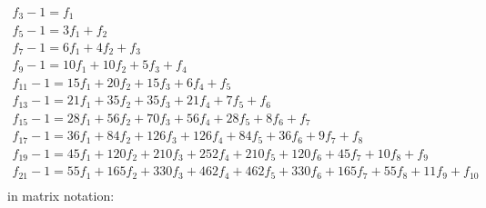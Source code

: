 \documentclass[a4paper,dottedtoc,headinclude,footinclude]{report} %
\theoremstyle{plain}
\begin{document}
    \begin{displaymath}
        \begin{array}{c}f_{3} - 1 = f_{1}\\
        f_{5} - 1 = 3 f_{1} + f_{2}\\
        f_{7} - 1 = 6 f_{1} + 4 f_{2} + f_{3}\\
        f_{9} - 1 = 10 f_{1} + 10 f_{2} + 5 f_{3} + f_{4}\\
        f_{11} - 1 = 15 f_{1} + 20 f_{2} + 15 f_{3} + 6 f_{4} + f_{5}\\
        f_{13} - 1 = 21 f_{1} + 35 f_{2} + 35 f_{3} + 21 f_{4} + 7 f_{5} + f_{6}\\
        f_{15} - 1 = 28 f_{1} + 56 f_{2} + 70 f_{3} + 56 f_{4} + 28 f_{5} + 8 f_{6} + f_{7}\\
        f_{17} - 1 = 36 f_{1} + 84 f_{2} + 126 f_{3} + 126 f_{4} + 84 f_{5} + 36 f_{6} + 9 f_{7} + f_{8}\\
        f_{19} - 1 = 45 f_{1} + 120 f_{2} + 210 f_{3} + 252 f_{4} + 210 f_{5} + 120 f_{6} + 45 f_{7} + 10 f_{8} + f_{9}\\
        f_{21} - 1 = 55 f_{1} + 165 f_{2} + 330 f_{3} + 462 f_{4} + 462 f_{5} + 330 f_{6} + 165 f_{7} + 55 f_{8} + 11 f_{9} + f_{10}\\
        \end{array}
    \end{displaymath}
    in matrix notation:
\end{document}
